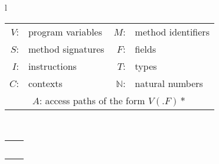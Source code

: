 \begin{figure}[tb!p]
\hspace{-2.5mm}
\begin{tabular}{l}
  \begin{small}
\begin{tabular}{r l r l}
	$V$: & program variables &  $M$: & method identifiers \\
	$S$: & method signatures &  $F$: & fields \\
	$I$: & instructions &  $T$: & types \\
	$C$: & contexts &  $\mathbb{N}$: & natural numbers \\
  \multicolumn{4}{c}{$A$: access paths of the form $V$$(.F)*$} \\
\end{tabular}  \end{small} \\
\hhline{=}
\hspace{-3mm}
\begin{tabular}{l l}
\pred{Move}{i: I, to: V, from: V}                & \args{\# i: to = from} \\
\pred{Load}{i: I, to: V, base: V, fld: F}       & \args{\# i: to = base.fld}\\
\pred{Store}{i: I, base: V, fld: F, from: V} & \args{\# i: base.fld = from} \\
\pred{Call}{i: I, base: V, sig: S}              & \args{\# i: base.sig(..)}   \\
\pred{Phi}{i: I, to: V, from1: V, \ldots}       & \args{\# i: to = $\phi$(from1, \ldots)}\\

\end{tabular}
\end{tabular}
\end{figure}
